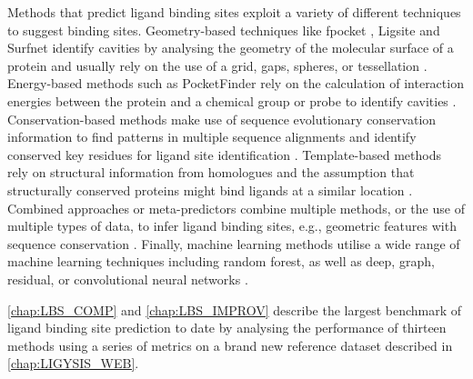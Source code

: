 Methods that predict ligand binding sites exploit a variety of different techniques to suggest binding sites. Geometry-based techniques like fpocket \cite{GUILLOUX_2009_FPOCKET}, Ligsite \cite{HENDLICH_1997_LIGSITE} and Surfnet \cite{LASKOWSKI_1995_SURFNET} identify cavities by analysing the geometry of the molecular surface of a protein and usually rely on the use of a grid, gaps, spheres, or tessellation \cite{GUILLOUX_2009_FPOCKET, LIANG_1998_CAVITIES, HENDLICH_1997_LIGSITE, LASKOWSKI_1995_SURFNET, KLEYWEGT_1994_CAVITIES, LEVITT_1992_POCKET, BRADY_2000_PASS, WEISEL_2007_POCKETPICKER}. Energy-based methods such as PocketFinder \cite{AN_2005_POCKETFINDER} rely on the calculation of interaction energies between the protein and a chemical group or probe to identify cavities \cite{AN_2005_POCKETFINDER, GOODFORD_1982_PREDICTOR, AN_2004_PREDICTOR, LAURIE_2005_QSITEFINDER, GHERSI_2009_SITEHOUND, NGAN_2012_FTSITE}. Conservation-based methods make use of sequence evolutionary conservation information to find patterns in multiple sequence alignments and identify conserved key residues for ligand site identification \cite{ARMON_2001_CONSURF, PUPKO_2002_RATE4SITE, XIE_2012_CONSPRED}. Template-based methods rely on structural information from homologues and the assumption that structurally conserved proteins might bind ligands at a similar location \cite{ZVELEBIL_1987_PREDICTION, WASS_2010_3DLIGANDSITE, ROY_2012_COFACTOR, YANG_2013_COFACTOR, LEE_2013_PREDICTION, BRYLINSKI_2013_EFINDSITE}. Combined approaches or meta-predictors combine multiple methods, or the use of multiple types of data, to infer ligand binding sites, e.g., geometric features with sequence conservation \cite{GUTTERIDGE_2003_LBSP, HUANG_2006_BU48, GLASER_2006_PREDICTION, HALGREN_2009_PREDICITON, CAPRA_2009_CONCAVITY, HUANG_2009_METAPOCKET, BRAY_2009_SITESIDENTIFY, BRYLINSKI_2009_FINDSITE}. Finally, machine learning methods utilise a wide range of machine learning techniques including random forest, as well as deep, graph, residual, or convolutional neural networks \cite{KRIVAK_2015_PRANK, KRIVAK_2015_P2RANK, JIMENEZ_2017_DEEPSITE, KRIVAK_2018_P2RANK, SANTANA_2020_GRaSP, KOZLOVSKII_2020_BITENET, STEPNIEWSKA_2020_KALASANTY, KANDEL_2021_PURESNET, MYOLNAS_2021_DEEPSURF, YAN_2022_POINTSITE, LI_2022_RECURPOCKET, AGGARWAL_2022_DEEPPOCKET, ABDOLLAHI_2023_NODECODER, EVTEEV_2023_SITERADAR, LI_2023_GLPOCKET, ZHANG_2024_EQUIPOCKET, LIU_2023_REFINEPOCKET, SMITH_2024_GrASP, CARBERY_2024_IFSP, SESTAK_2024_VNEGNN, KANDEL_2024_PURESNET}.

\autoref{chap:LBS_COMP} and \autoref{chap:LBS_IMPROV} describe the largest benchmark of ligand binding site prediction to date by analysing the performance of thirteen methods using a series of metrics on a brand new reference dataset described in \autoref{chap:LIGYSIS_WEB}.

